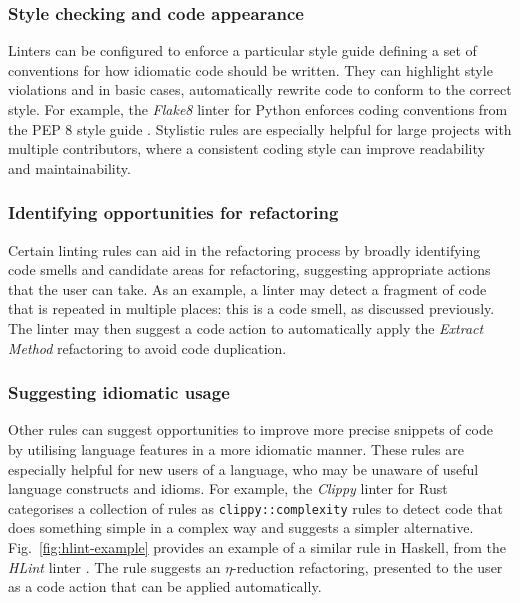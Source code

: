 \subsubsection{Style checking and code appearance}
Linters can be configured to enforce a particular style guide defining a set of conventions for how idiomatic code should be written.
They can highlight style violations and in basic cases, automatically rewrite code to conform to the correct style.
For example, the \textit{Flake8} linter for Python  enforces coding conventions from the PEP 8 style guide .
Stylistic rules are especially helpful for large projects with multiple contributors, where a consistent coding style can improve readability and maintainability.

\subsubsection{Identifying opportunities for refactoring}
Certain linting rules can aid in the refactoring process by broadly identifying code smells and candidate areas for refactoring, suggesting appropriate actions that the user can take.
As an example, a linter may detect a fragment of code that is repeated in multiple places: this is a code smell, as discussed previously.
The linter may then suggest a code action to automatically apply the \textit{Extract Method} refactoring to avoid code duplication.

\subsubsection{Suggesting idiomatic usage}
Other rules can suggest opportunities to improve more precise snippets of code by utilising language features in a more idiomatic manner.
These rules are especially helpful for new users of a language, who may be unaware of useful language constructs and idioms.
For example, the \textit{Clippy} linter for Rust  categorises a collection of rules as \texttt{clippy::complexity} rules to detect code that does something simple in a complex way and suggests a simpler alternative.
Fig.~\ref{fig:hlint-example} provides an example of a similar rule in Haskell, from the \textit{HLint} linter \cite{mitchell_hlint_2024}.
The rule suggests an $\eta$-reduction refactoring, presented to the user as a code action that can be applied automatically.


